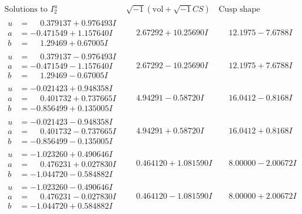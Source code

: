 \documentclass[1p]{elsarticle_modified}
\theoremstyle{definition}
\newcommand{\I}{\sqrt{-1}}
\begin{document}
$$\begin{array}{c|c|c}  
\text{Solutions to }I^u_{2}& \I (\text{vol} + \sqrt{-1}CS) & \text{Cusp shape}\\
 \hline 
\begin{aligned}
u &= \phantom{-}0.379137 + 0.976493 I \\
a &= -0.471549 + 1.157640 I \\
b &= \phantom{-}1.29469 + 0.67005 I\end{aligned}
 & \phantom{-}2.67292 + 10.25690 I & \phantom{-}12.1975 - 7.6788 I \\ \hline\begin{aligned}
u &= \phantom{-}0.379137 - 0.976493 I \\
a &= -0.471549 - 1.157640 I \\
b &= \phantom{-}1.29469 - 0.67005 I\end{aligned}
 & \phantom{-}2.67292 - 10.25690 I & \phantom{-}12.1975 + 7.6788 I \\ \hline\begin{aligned}
u &= -0.021423 + 0.948358 I \\
a &= \phantom{-}0.401732 + 0.737665 I \\
b &= -0.856499 + 0.135005 I\end{aligned}
 & \phantom{-}4.94291 - 0.58720 I & \phantom{-}16.0412 - 0.8168 I \\ \hline\begin{aligned}
u &= -0.021423 - 0.948358 I \\
a &= \phantom{-}0.401732 - 0.737665 I \\
b &= -0.856499 - 0.135005 I\end{aligned}
 & \phantom{-}4.94291 + 0.58720 I & \phantom{-}16.0412 + 0.8168 I \\ \hline\begin{aligned}
u &= -1.023260 + 0.490646 I \\
a &= \phantom{-}0.476231 + 0.027830 I \\
b &= -1.044720 - 0.584882 I\end{aligned}
 & \phantom{-}0.464120 + 1.081590 I & \phantom{-}8.00000 - 2.00672 I \\ \hline\begin{aligned}
u &= -1.023260 - 0.490646 I \\
a &= \phantom{-}0.476231 - 0.027830 I \\
b &= -1.044720 + 0.584882 I\end{aligned}
 & \phantom{-}0.464120 - 1.081590 I & \phantom{-}8.00000 + 2.00672 I \\ \hline\begin{aligned}

\end{aligned}
\end{array}$$
\end{document}
